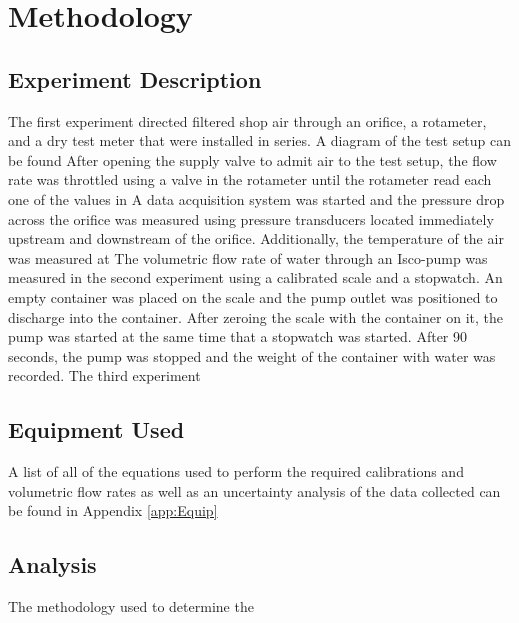 \documentclass[paper=letter, fontsize=10pt]{scrartcl} %
\begin{document}
\section{Methodology}
\subsection{Experiment Description}
The first experiment directed filtered shop air through an orifice, a rotameter, and a dry test meter that were installed in series.  A diagram of the test setup can be found %
After opening the supply valve to admit air to the test setup, the flow rate was throttled using a valve in the rotameter until the rotameter read each one of the values in %
A data acquisition system was started and the pressure drop across the orifice was measured using pressure transducers located immediately upstream and downstream of the orifice.  Additionally, the temperature of the air was measured at %
\newline %
\newline
The volumetric flow rate of water through an Isco-pump was measured in the second experiment using a calibrated scale and a stopwatch.  An empty container was placed on the scale and the pump outlet was positioned to discharge into the container.  After zeroing the scale with the container on it, the pump was started at the same time that a stopwatch was started.  After 90 seconds, the pump was stopped and the weight of the container with water was recorded.
\newline
\newline
The third experiment 

\subsection{Equipment Used}
A list of all of the equations used to perform the required calibrations and volumetric flow rates as well as an uncertainty analysis of the data collected can be found in Appendix \ref{app:Equip}

\subsection{Analysis}
The methodology used to determine the 
\end{document}
